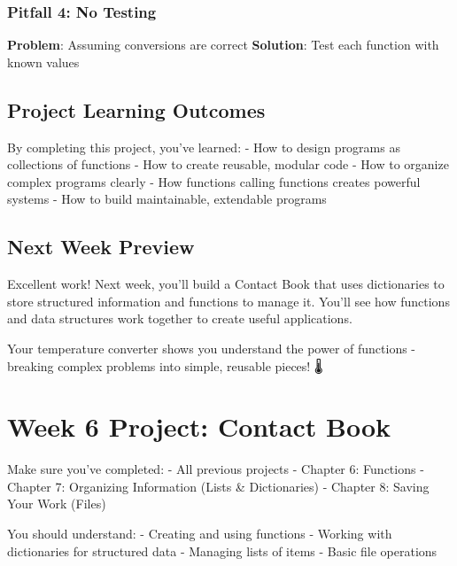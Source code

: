 \documentclass[
  letterpaper,
  DIV=11,
  numbers=noendperiod,
  oneside]{scrreprt}
\begin{document}
\subsection{Pitfall 4: No Testing}\label{pitfall-4-no-testing}

\textbf{Problem}: Assuming conversions are correct \textbf{Solution}:
Test each function with known values

\section{Project Learning Outcomes}\label{project-learning-outcomes-4}

By completing this project, you've learned: - How to design programs as
collections of functions - How to create reusable, modular code - How to
organize complex programs clearly - How functions calling functions
creates powerful systems - How to build maintainable, extendable
programs

\section{Next Week Preview}\label{next-week-preview-3}

Excellent work! Next week, you'll build a Contact Book that uses
dictionaries to store structured information and functions to manage it.
You'll see how functions and data structures work together to create
useful applications.

Your temperature converter shows you understand the power of functions -
breaking complex problems into simple, reusable pieces! 🌡️

\chapter{Week 6 Project: Contact Book}\label{sec-project-contact-book}

\begin{tcolorbox}[enhanced jigsaw, opacityback=0, colback=white, colframe=quarto-callout-important-color-frame, breakable, titlerule=0mm, coltitle=black, rightrule=.15mm, colbacktitle=quarto-callout-important-color!10!white, left=2mm, bottomtitle=1mm, bottomrule=.15mm, title=\textcolor{quarto-callout-important-color}{\faExclamation}\hspace{0.5em}{Before You Start}, opacitybacktitle=0.6, toptitle=1mm, leftrule=.75mm, arc=.35mm, toprule=.15mm]

Make sure you've completed: - All previous projects - Chapter 6:
Functions - Chapter 7: Organizing Information (Lists \& Dictionaries) -
Chapter 8: Saving Your Work (Files)

You should understand: - Creating and using functions - Working with
dictionaries for structured data - Managing lists of items - Basic file
operations

\end{tcolorbox}
\end{document}
